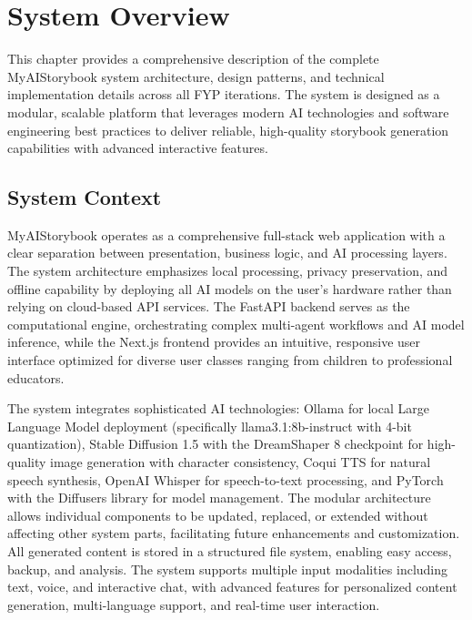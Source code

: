 \chapter{System Overview}
\label{sec:system-overview}

This chapter provides a comprehensive description of the complete MyAIStorybook system architecture, design patterns, and technical implementation details across all FYP iterations. The system is designed as a modular, scalable platform that leverages modern AI technologies and software engineering best practices to deliver reliable, high-quality storybook generation capabilities with advanced interactive features.

\section{System Context}
MyAIStorybook operates as a comprehensive full-stack web application with a clear separation between presentation, business logic, and AI processing layers. The system architecture emphasizes local processing, privacy preservation, and offline capability by deploying all AI models on the user's hardware rather than relying on cloud-based API services. The FastAPI backend serves as the computational engine, orchestrating complex multi-agent workflows and AI model inference, while the Next.js frontend provides an intuitive, responsive user interface optimized for diverse user classes ranging from children to professional educators.

The system integrates sophisticated AI technologies: Ollama for local Large Language Model deployment (specifically llama3.1:8b-instruct with 4-bit quantization), Stable Diffusion 1.5 with the DreamShaper 8 checkpoint for high-quality image generation with character consistency, Coqui TTS \cite{coqui2024} for natural speech synthesis, OpenAI Whisper \cite{whisper2023} for speech-to-text processing, and PyTorch \cite{pytorch2024} with the Diffusers library \cite{diffusers2024} for model management. The modular architecture allows individual components to be updated, replaced, or extended without affecting other system parts, facilitating future enhancements and customization. All generated content is stored in a structured file system, enabling easy access, backup, and analysis. The system supports multiple input modalities including text, voice, and interactive chat, with advanced features for personalized content generation, multi-language support, and real-time user interaction.

